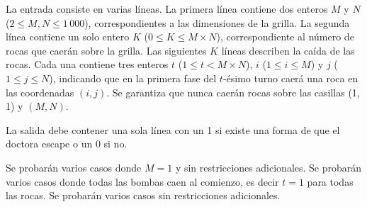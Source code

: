 \documentclass{oci}
\begin{document}
\begin{inputDescription}
  La entrada consiste en varias líneas.
  La primera línea contiene dos enteros $M$ y $N$ ($2 \le M, N \le 1\,000$), correspondientes a las
  dimensiones de la grilla.
  La segunda línea contiene un solo entero $K$ ($0 \le K \le M\times N$), correspondiente al número de
  rocas que caerán sobre la grilla.
  Las siguientes $K$ líneas describen la caída de las rocas.
  Cada una contiene tres enteros $t$ ($1 \le t < M\times N$), $i$ ($1 \le i \le M$) y $j$ ($1 \le
  j \le N$), indicando que en la primera fase del $t$-ésimo turno caerá una roca en las coordenadas $(i,
  j)$.
  Se garantiza que nunca caerán rocas sobre las casillas (1, 1) y $(M, N)$.
\end{inputDescription}

\begin{outputDescription}
  La salida debe contener una sola línea con un 1 si existe una forma de que el doctora escape o un 0
  si no.
\end{outputDescription}

\begin{scoreDescription}
  Se probarán varios casos donde $M = 1$ y sin restricciones adicionales.
  Se probarán varios casos donde todas las bombas caen al comienzo, es decir $t = 1$ para todas las rocas.
  Se probarán varios casos sin restricciones adicionales.
\end{scoreDescription}

\begin{sampleDescription}
\end{sampleDescription}
\end{document}
